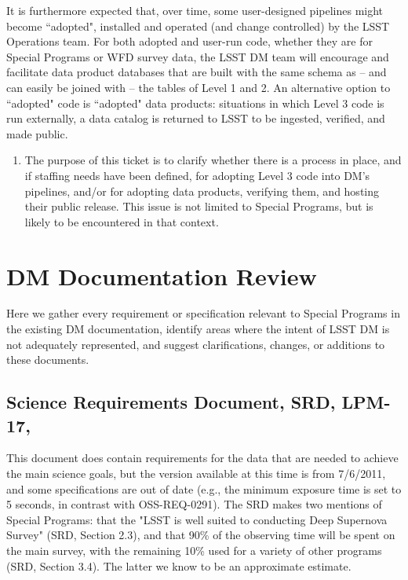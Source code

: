 \documentclass[DM,lsstdraft,toc]{lsstdoc}
\begin{document}
It is furthermore expected that, over time, some user-designed pipelines might become ``adopted", installed and operated (and change controlled) by the LSST Operations team. For both adopted and user-run code, whether they are for Special Programs or WFD survey data, the LSST DM team will encourage and facilitate data product databases that are built with the same schema as -- and can easily be joined with -- the tables of Level 1 and 2. An alternative option to ``adopted" code is ``adopted" data products: situations in which Level 3 code is run externally, a data catalog is returned to LSST to be ingested, verified, and made public. 

\begin{enumerate}[resume,topsep=-10pt,after=\vspace{10pt},label= \textbf{Action \Roman*}] \item \label{L3-2} The purpose of this ticket is to clarify whether there is a process in place, and if staffing needs have been defined, for adopting Level 3 code into DM's pipelines, and/or for adopting data products, verifying them, and hosting their public release. This issue is not limited to Special Programs, but is likely to be encountered in that context. \end{enumerate}



\clearpage
\section{DM Documentation Review}\label{sec:docrev}

Here we gather every requirement or specification relevant to Special Programs in the existing DM documentation, identify areas where the intent of LSST DM is not adequately represented, and suggest clarifications, changes, or additions to these documents.

\subsection{Science Requirements Document, SRD, LPM-17, \cite{LPM-17}}\label{ssec:docrev_srd}

This document does contain requirements for the data that are needed to achieve the main science goals, but the version available at this time is from 7/6/2011, and some specifications are out of date (e.g., the minimum exposure time is set to 5 seconds, in contrast with OSS-REQ-0291). The SRD makes two mentions of Special Programs: that the "LSST is well suited to conducting Deep Supernova Survey" (SRD, Section 2.3), and that 90\% of the observing time will be spent on the main survey, with the remaining 10\% used for a variety of other programs (SRD, Section 3.4). The latter we know to be an approximate estimate.
\end{document}
